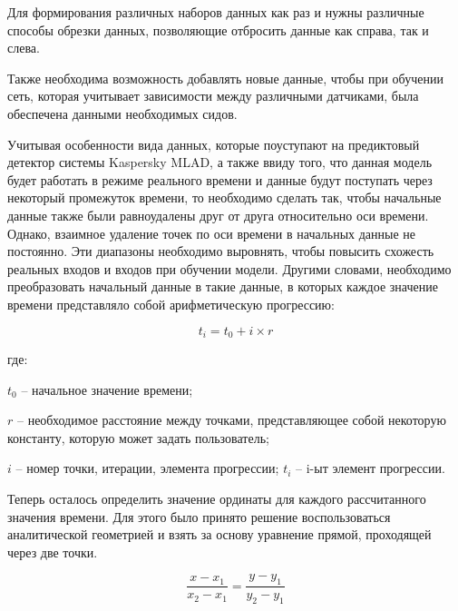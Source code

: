{  \par \redline Для формирования различных наборов данных как раз и нужны различные способы обрезки данных, позволяющие отбросить данные как справа, так и слева. 
 
  \par \redline Также необходима возможность добавлять новые данные, чтобы при обучении сеть, которая учитывает зависимости между различными датчиками, была обеспечена данными необходимых сидов.  

  \par \redline Учитывая особенности вида данных, которые поуступают на предиктовый детектор системы Kaspersky MLAD, а также ввиду того, что данная модель будет работать в режиме реального времени и данные будут поступать через некоторый промежуток времени, то необходимо сделать так, чтобы начальные данные также были равноудалены друг от друга относительно оси времени. Однако, взаимное удаление точек по оси времени в начальных данные не постоянно. Эти диапазоны необходимо выровнять, чтобы повысить схожесть реальных входов и входов при обучении модели. Другими словами, необходимо преобразовать начальный данные в такие данные, в которых каждое значение времени представляло собой арифметическую прогрессию:

  \begin{equation}
    t_i = t_0 + i \times r
  \end{equation} \addtocounter{formulacntr}{1}

  \par \redline где:
  \par \redline $t_0$ {--} начальное значение времени;
  \par \redline $r$ {--} необходимое расстояние между точками, представляющее собой некоторую константу, которую может задать пользователь; 
  \par \redline $i$ {--} номер точки, итерации, элемента прогрессии; $t_i$ {--} i-ыт элемент прогрессии. 

  \par \redline Теперь осталось определить значение ординаты для каждого рассчитанного значения времени. Для этого было принято решение воспользоваться аналитической геометрией и взять за основу уравнение прямой, проходящей через две точки.  

  \begin{equation} \tag{\thechaptercntr .\theformulacntr}
    \frac{x - x_1}{x_2 - x_1} = \frac{y - y_1}{y_2 - y_1}
  \end{equation} \addtocounter{formulacntr}{1}

}
